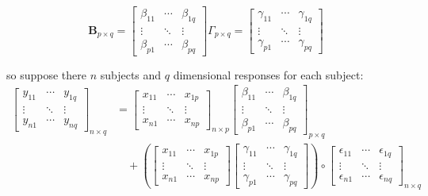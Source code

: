 \documentclass{article}
\begin{document}
\begin{displaymath}
\bm{B}_{p\times q} = 
\begin{bmatrix}
\beta_{11}& \cdots & \beta_{1q} \\
\vdots & \ddots & \vdots \\
\beta_{p1} & \cdots & \beta_{pq}
\end{bmatrix}
\Gamma_{p\times q} = 
\begin{bmatrix}
\gamma_{11} & \cdots & \gamma_{1q} \\
\vdots & \ddots & \vdots \\
\gamma_{p1} & \cdots & \gamma_{pq}
\end{bmatrix}
\end{displaymath}

so suppose there $n$ subjects and $q$ dimensional responses for each
subject: 
\begin{align}
\begin{bmatrix}
y_{11} &\cdots & y_{1q} \\
\vdots & \ddots & \vdots \\
y_{n1} & \cdots & y_{nq} 
\end{bmatrix}_{n\times q}
& = 
\begin{bmatrix}
x_{11} &\cdots & x_{1p} \\
\vdots & \ddots & \vdots \\
x_{n1} & \cdots & x_{np} 
\end{bmatrix}_{n\times p}
\begin{bmatrix}
\beta_{11} &\cdots & \beta_{1q} \\
\vdots & \ddots & \vdots \\
\beta_{p1} & \cdots & \beta_{pq} 
\end{bmatrix}_{p\times q} \nonumber\\
& \quad + 
\left( \begin{bmatrix}
x_{11} &\cdots & x_{1p} \\
\vdots & \ddots & \vdots \\
x_{n1} & \cdots & x_{np} 
\end{bmatrix}
\begin{bmatrix}
\gamma_{11} &\cdots & \gamma_{1q} \\
\vdots & \ddots & \vdots \\
\gamma_{p1} & \cdots & \gamma_{pq} 
\end{bmatrix}
 \right)
\circ
\begin{bmatrix}
\epsilon_{11} &\cdots & \epsilon_{1q} \\
\vdots & \ddots & \vdots \\
\epsilon_{n1} & \cdots & \epsilon_{nq} 
\end{bmatrix}_{n\times q}
\end{align}
\end{document}
